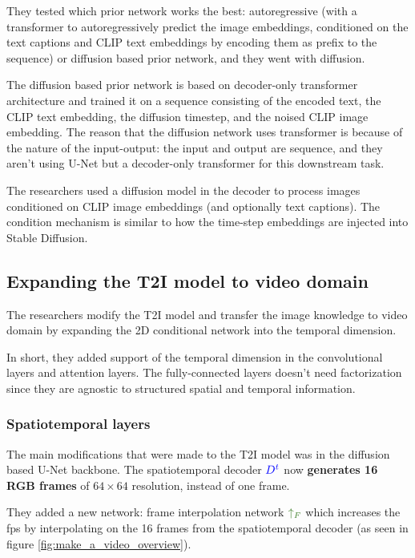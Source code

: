 They tested which prior network works the best: autoregressive (with a transformer to autoregressively predict the image embeddings, conditioned on the text captions and CLIP text embeddings by encoding them as prefix to the sequence) or diffusion based prior network, and they went with diffusion. 

The diffusion based prior network is based on decoder-only transformer architecture and trained it on a sequence consisting of the encoded text, the CLIP text embedding, the diffusion timestep, and the noised CLIP image embedding. The reason that the diffusion network uses transformer is because of the nature of the input-output: the input and output are sequence, and they aren't using U-Net but a decoder-only transformer for this downstream task.

The researchers used a diffusion model in the decoder to process images conditioned on CLIP image embeddings (and optionally text captions). The condition mechanism is similar to how the time-step embeddings are injected into Stable Diffusion.







\subsection{Expanding the T2I model to video domain}

The researchers modify the T2I model and transfer the image knowledge to video domain by expanding the 2D conditional network into the temporal dimension.

In short, they added support of the temporal dimension in the convolutional layers and attention layers. The fully-connected layers doesn't need factorization since they are agnostic to structured spatial and temporal information.

\subsubsection{Spatiotemporal layers}

The main modifications that were made to the T2I model was in the diffusion based U-Net backbone. The spatiotemporal decoder $\textcolor{blue}{D^t}$ now \textbf{generates 16 RGB frames} of $64\times 64$ resolution, instead of one frame.

They added a new network: frame interpolation network $\textcolor{OliveGreen}{\uparrow_F}$ which increases the fps by interpolating on the 16 frames from the spatiotemporal decoder (as seen in figure \ref{fig:make_a_video_overview}).


